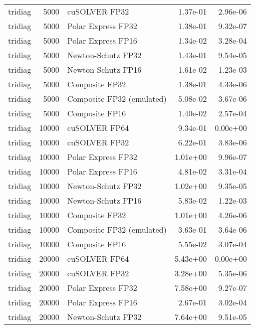 \begin{table}
\begin{tabular}{lrlrr}
  tridiag &  5000 &             cuSOLVER FP32 &  1.37e-01 &        2.96e-06 \\
  tridiag &  5000 &        Polar Express FP32 &  1.38e-01 &        9.32e-07 \\
  tridiag &  5000 &        Polar Express FP16 &  1.34e-02 &        3.28e-04 \\
  tridiag &  5000 &        Newton-Schutz FP32 &  1.43e-01 &        9.54e-05 \\
  tridiag &  5000 &        Newton-Schutz FP16 &  1.61e-02 &        1.23e-03 \\
  tridiag &  5000 &            Composite FP32 &  1.38e-01 &        4.33e-06 \\
  tridiag &  5000 & Composite FP32 (emulated) &  5.08e-02 &        3.67e-06 \\
  tridiag &  5000 &            Composite FP16 &  1.40e-02 &        2.57e-04 \\
  tridiag & 10000 &             cuSOLVER FP64 &  9.34e-01 &        0.00e+00 \\
  tridiag & 10000 &             cuSOLVER FP32 &  6.22e-01 &        3.83e-06 \\
  tridiag & 10000 &        Polar Express FP32 &  1.01e+00 &        9.96e-07 \\
  tridiag & 10000 &        Polar Express FP16 &  4.81e-02 &        3.31e-04 \\
  tridiag & 10000 &        Newton-Schutz FP32 &  1.02e+00 &        9.35e-05 \\
  tridiag & 10000 &        Newton-Schutz FP16 &  5.83e-02 &        1.22e-03 \\
  tridiag & 10000 &            Composite FP32 &  1.01e+00 &        4.26e-06 \\
  tridiag & 10000 & Composite FP32 (emulated) &  3.63e-01 &        3.64e-06 \\
  tridiag & 10000 &            Composite FP16 &  5.55e-02 &        3.07e-04 \\
  tridiag & 20000 &             cuSOLVER FP64 &  5.43e+00 &        0.00e+00 \\
  tridiag & 20000 &             cuSOLVER FP32 &  3.28e+00 &        5.35e-06 \\
  tridiag & 20000 &        Polar Express FP32 &  7.58e+00 &        9.27e-07 \\
  tridiag & 20000 &        Polar Express FP16 &  2.67e-01 &        3.02e-04 \\
  tridiag & 20000 &        Newton-Schutz FP32 &  7.64e+00 &        9.51e-05 \\

\end{tabular}
\end{table}
